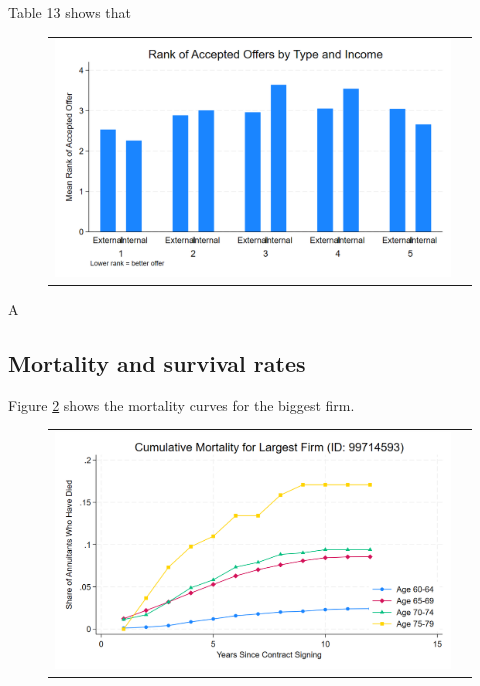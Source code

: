 \documentclass[12pt]{article}
\begin{document}





Table 13 shows that




  \begin{figure}[H]
\caption{}
 \label{fig:ie4_11}
\centering{}%
\begin{tabular}{cc}
\includegraphics[scale=0.17]{../figures/IE4/IE4_rank_by_type_income.png} 
\end{tabular}
\end{figure} 

\newpage
A
\newpage
\subsection{Mortality and survival rates}

Figure \ref{fig:ie4_12} shows the mortality curves for the biggest firm. 

\begin{figure}[H]
\caption{}
\label{fig:ie4_12}
\centering{}%
\begin{tabular}{cc}
\includegraphics[scale=0.2]{../figures/IE4/IE4_mortality_curves_by_age.png} 
\end{tabular}
\end{figure} 
\end{document}

